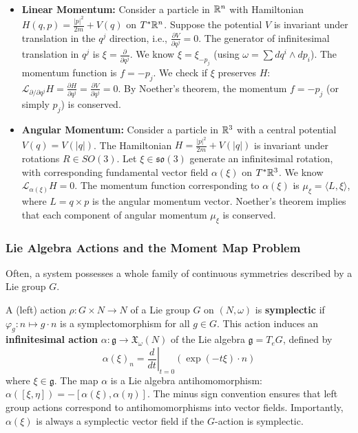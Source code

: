 \begin{example}
\,
\begin{itemize}
    \item \textbf{Linear Momentum:} Consider a particle in $\mathbb{R}^n$ with Hamiltonian $H(q, p) = \frac{|p|^2}{2m} + V(q)$ on $T^*\mathbb{R}^n$. Suppose the potential $V$ is invariant under translation in the $q^j$ direction, i.e., $\frac{\partial V}{\partial q^j} = 0$. The generator of infinitesimal translation in $q^j$ is $\xi = \frac{\partial}{\partial q^j}$. We know $\xi = \xi_{-p_j}$ (using $\omega = \sum dq^i \wedge dp_i$). The momentum function is $f = -p_j$. We check if $\xi$ preserves $H$: $\mathcal{L}_{\partial/\partial q^j} H = \frac{\partial H}{\partial q^j} = \frac{\partial V}{\partial q^j} = 0$. By Noether's theorem, the momentum $f = -p_j$ (or simply $p_j$) is conserved.
    \item \textbf{Angular Momentum:} Consider a particle in $\mathbb{R}^3$ with a central potential $V(q) = V(|q|)$. The Hamiltonian $H = \frac{|p|^2}{2m} + V(|q|)$ is invariant under rotations $R \in SO(3)$. Let $\xi \in \mathfrak{so}(3)$ generate an infinitesimal rotation, with corresponding fundamental vector field $\alpha(\xi)$ on $T^*\mathbb{R}^3$. We know $\mathcal{L}_{\alpha(\xi)} H = 0$. The momentum function corresponding to $\alpha(\xi)$ is $\mu_\xi = \langle L, \xi \rangle$, where $L = q \times p$ is the angular momentum vector. Noether's theorem implies that each component of angular momentum $\mu_\xi$ is conserved.
\end{itemize}
\end{example}


\subsubsection{Lie Algebra Actions and the Moment Map Problem}

Often, a system possesses a whole family of continuous symmetries described by a Lie group $G$.

\begin{definition}
A (left) action $\rho: G \times N \to N$ of a Lie group $G$ on $(N, \omega)$ is \textbf{symplectic} if $\varphi_g: n \mapsto g \cdot n$ is a symplectomorphism for all $g \in G$. This action induces an \textbf{infinitesimal action} $\alpha: \mathfrak{g}\to \mathfrak{X}_{\omega}(N)$ of the Lie algebra $\mathfrak{g}= T_e G$, defined by
\[ \alpha(\xi)_n = \left. \frac{d}{dt} \right|_{t=0} ( \exp(-t\xi) \cdot n ) \]
where $\xi \in \mathfrak{g}$. The map $\alpha$ is a Lie algebra antihomomorphism: $\alpha([\xi, \eta]) = -[\alpha(\xi), \alpha(\eta)]$. The minus sign convention ensures that left group actions correspond to antihomomorphisms into vector fields. Importantly, $\alpha(\xi)$ is always a symplectic vector field if the $G$-action is symplectic.
\end{definition}

